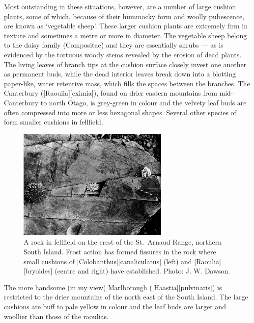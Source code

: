 Most outstanding in these situations, however, are a number of large cushion plants, some of which, because of their hummocky form and woolly pubescence, are known as `vegetable sheep'.
These larger cushion plants are extremely firm in texture and sometimes a metre or more in diameter.
The vegetable sheep belong to the daisy family (Compositae) and they are essentially shrubs --- as is evidenced by the tortuous woody stems revealed by the erosion of dead plants.
The living leaves of branch tips at the cushion surface closely invest one another as permanent buds, while the dead interior leaves break down into a blotting paper-like, water retentive mass, which fills the spaces between the branches.
The Canterbury  ([Raoulia][eximia]), found on drier eastern mountains from mid-Canterbury to north Otago, is grey-green in colour and the velvety leaf buds are often compressed into more or less hexagonal shapes.
Several other species of  form smaller cushions in fellfield.
\begin{figure}
	\includegraphics[width=0.66\textwidth]{graphics/figure107fellfield-rock.jpg}
	\centering
	\caption[A rock in fellfield on the crest of the St.\ Arnaud Range]{A rock in fellfield on the crest of the St.\ Arnaud Range, northern South Island.
	Frost action has formed fissures in the rock where small cushions of [Colobanthus][canaliculatus] (left) and [Raoulia][bryoides] (centre and right) have established.
	Photo: J. W. Dawson.}%
	\label{fig:107fellfield-rock}
\end{figure}
The more handsome (in my view) Marlborough  ([Haastia][pulvinaris]) is restricted to the drier mountains of the north east of the South Island.
The large cushions are buff to pale yellow in colour and the leaf buds are larger and woollier than those of the raoulias.

